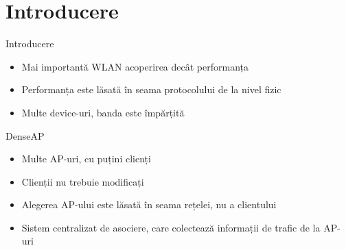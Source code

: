 \section{Introducere}

\begin{frame}{Introducere}
  \begin{itemize}
    \item Mai importantă WLAN acoperirea decât performanța
    \item Performanța este lăsată în seama protocolului de la nivel fizic
    \item Multe device-uri, banda este împărțită
  \end{itemize}
\end{frame}

\begin{frame}{DenseAP}
  \begin{itemize}
    \item Multe AP-uri, cu puțini clienți
    \item Clienții nu trebuie modificați
    \pause
    \item Alegerea AP-ului este lăsată în seama rețelei, nu a clientului
    \item Sistem centralizat de asociere, care colectează informații de trafic de la AP-uri
  \end{itemize}
\end{frame}

